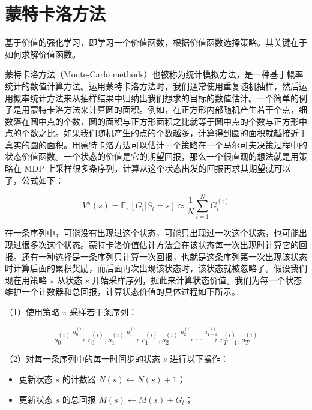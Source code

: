 \setcounter{section}{0}

\hypertarget{ux8499ux7279ux5361ux6d1bux65b9ux6cd5}{%
\section{蒙特卡洛方法}\label{ux8499ux7279ux5361ux6d1bux65b9ux6cd5}}

基于价值的强化学习，即学习一个价值函数，根据价值函数选择策略。其关键在于如何求解价值函数。

蒙特卡洛方法（Monte-Carlo methods）也被称为统计模拟方法，是一种基于概率统计的数值计算方法。运用蒙特卡洛方法时，我们通常使用重复随机抽样，然后运用概率统计方法来从抽样结果中归纳出我们想求的目标的数值估计。一个简单的例子是用蒙特卡洛方法来计算圆的面积。例如，在正方形内部随机产生若干个点，细数落在圆中点的个数，圆的面积与正方形面积之比就等于圆中点的个数与正方形中点的个数之比。如果我们随机产生的点的个数越多，计算得到圆的面积就越接近于真实的圆的面积。用蒙特卡洛方法可以估计一个策略在一个马尔可夫决策过程中的状态价值函数。一个状态的价值是它的期望回报，那么一个很直观的想法就是用策略在 MDP 上采样很多条序列，计算从这个状态出发的回报再求其期望就可以了，公式如下：

\[
V^\pi(s)=\mathbb{E}_\pi[G_t|S_t=s]\approx \frac{1}{N}\sum_{i=1}^{N}G_t^{(i)}
\]

在一条序列中，可能没有出现过这个状态，可能只出现过一次这个状态，也可能出现过很多次这个状态。蒙特卡洛价值估计方法会在该状态每一次出现时计算它的回报。还有一种选择是一条序列只计算一次回报，也就是这条序列第一次出现该状态时计算后面的累积奖励，而后面再次出现该状态时，该状态就被忽略了。假设我们现在用策略 \(\pi\) 从状态 \(s\) 开始采样序列，据此来计算状态价值。我们为每一个状态维护一个计数器和总回报，计算状态价值的具体过程如下所示。

（1）使用策略 \(\pi\) 采样若干条序列：

\[
s_0^{(i)} \xrightarrow{a_0^{(i)}} r_0^{(i)},s_1^{(i)} \xrightarrow{a_1^{(i)}} r_1^{(i)},s_2^{(i)} \xrightarrow{a_2^{(i)}} \cdots \xrightarrow{a_{T-1}^{(i)}} r_{T-1}^{(i)},s_T^{(i)}
\]

（2）对每一条序列中的每一时间步的状态 \(s\) 进行以下操作：

\begin{itemize}
\tightlist
\item
  更新状态 \(s\) 的计数器 \(N(s)\leftarrow N(s)+1\)；
\item
  更新状态 \(s\) 的总回报 \(M(s)\leftarrow M(s)+G_t\)；
\end{itemize}

